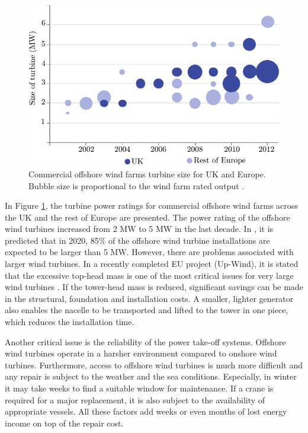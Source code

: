 \documentclass[a4paper, 11pt]{article} %
\begin{document}
\begin{figure}[]
  \centering
  \includegraphics[scale=0.8]{offshore-turbine-size}
\caption{Commercial offshore wind farms turbine size for UK and Europe. Bubble size is proportional to the wind farm rated output \cite{bvg}.}
  \label{offshore-turbine-size}
\end{figure}

In Figure \ref{offshore-turbine-size}, the turbine power ratings for commercial offshore wind farms across the UK and the rest of Europe are presented. 
The power rating of the offshore wind turbines increased from 2 MW to 5 MW in the last decade. 
In \cite{offshore_wind_report2009}, it is predicted that in 2020, 85\% of the offshore wind turbine installations are expected to be larger than 5 MW.
However, there are problems associated with larger wind turbines. In a recently completed EU project (Up-Wind), it is stated that the excessive top-head mass is one of the most critical issues for very large wind turbines \cite{upwind2011}. If the tower-head mass is reduced, significant savings can be made in the structural, foundation and installation costs. A smaller, lighter generator also enables the nacelle to be transported and lifted to the tower in one piece, which reduces the installation time.

Another critical issue is the reliability of the power take-off systems. Offshore wind turbines operate in a harsher environment compared to onshore wind turbines. Furthermore, access to offshore wind turbines is much more difficult and any repair is subject to the weather and the sea conditions. Especially, in winter it may take weeks to find a suitable window for maintenance. If a crane is required for a major replacement, it is also subject to the availability of appropriate vessels. All these factors add weeks or even months of lost energy income on top of the repair cost. 
\end{document}
